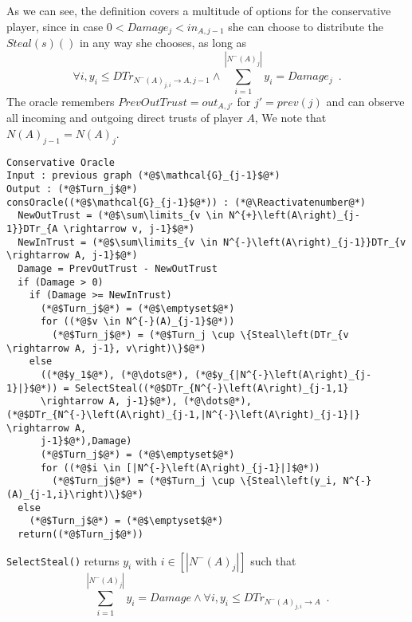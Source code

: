 \documentclass[11pt]{llncs}
\makeatletter
\newcommand*\Suppressnumber{%
  \lst@AddToHook{OnNewLine}{%
    \let\thelstnumber\relax%
     \advance\c@lstnumber-\@ne\relax%
    }%
}
\makeatother
\begin{document}
     As we can see, the definition covers a multitude of options for the conservative player, since in case $0 < Damage_j <
     in_{A,j-1}$ she can choose to distribute the $Steal\left(s\right)\left(\right)$ in any way she chooses, as long as
     \begin{equation}
        \forall i, y_i \leq DTr_{N^{-}\left(A\right)_{j,i} \rightarrow A, j-1}
        \wedge \sum\limits_{i=1}^{|N^{-}\left(A\right)_j|}y_i = Damage_j \enspace.
     \end{equation}
     The oracle remembers $PrevOutTrust = out_{A, j'}$ for  $j' = prev\left(j\right)$ and can observe all incoming and
     outgoing direct trusts of player $A$,
     We note that $N\left(A\right)_{j-1} = N\left(A\right)_j$. \\
     \Suppressnumber
     \begin{lstlisting}[label=conservativeoracle, style=numbers]
Conservative Oracle
Input : previous graph (*@$\mathcal{G}_{j-1}$@*)
Output : (*@$Turn_j$@*)
consOracle((*@$\mathcal{G}_{j-1}$@*)) : (*@\Reactivatenumber@*)
  NewOutTrust = (*@$\sum\limits_{v \in N^{+}\left(A\right)_{j-1}}DTr_{A \rightarrow v, j-1}$@*)
  NewInTrust = (*@$\sum\limits_{v \in N^{-}\left(A\right)_{j-1}}DTr_{v \rightarrow A, j-1}$@*)
  Damage = PrevOutTrust - NewOutTrust
  if (Damage > 0)
    if (Damage >= NewInTrust)
      (*@$Turn_j$@*) = (*@$\emptyset$@*)
      for ((*@$v \in N^{-}(A)_{j-1}$@*))
        (*@$Turn_j$@*) = (*@$Turn_j \cup \{Steal\left(DTr_{v \rightarrow A, j-1}, v\right)\}$@*)
    else
      ((*@$y_1$@*), (*@\dots@*), (*@$y_{|N^{-}\left(A\right)_{j-1}|}$@*)) = SelectSteal((*@$DTr_{N^{-}\left(A\right)_{j-1,1}
      \rightarrow A, j-1}$@*), (*@\dots@*), (*@$DTr_{N^{-}\left(A\right)_{j-1,|N^{-}\left(A\right)_{j-1}|} \rightarrow A,
      j-1}$@*),Damage)
      (*@$Turn_j$@*) = (*@$\emptyset$@*)
      for ((*@$i \in [|N^{-}\left(A\right)_{j-1}|]$@*))
        (*@$Turn_j$@*) = (*@$Turn_j \cup \{Steal\left(y_i, N^{-}(A)_{j-1,i}\right)\}$@*)
  else
    (*@$Turn_j$@*) = (*@$\emptyset$@*)
  return((*@$Turn_j$@*))
     \end{lstlisting}
     \texttt{SelectSteal()} returns $y_i$ with $i \in [|N^{-}\left(A\right)_j|]$ such that
     \begin{equation}
        \sum\limits_{i=1}^{|N^{-}\left(A\right)_j|}y_i = Damage \wedge \forall i, y_i \leq DTr_{N^{-}\left(A\right)_{j,i}
        \rightarrow A} \enspace.
     \end{equation}
\end{document}
